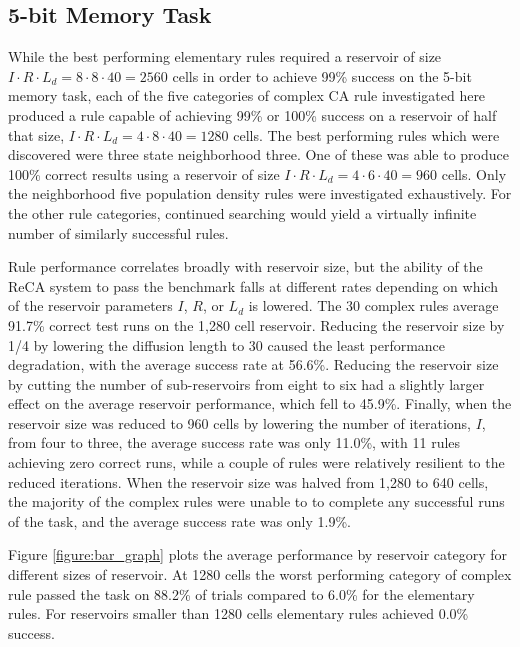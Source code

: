 \documentclass{elsarticle}
\begin{document}
\begin{multicols}{2}
	\subsection{5-bit Memory Task}
	While the best performing elementary rules required a reservoir of size $I \cdot R 
	\cdot L_{d} = 8 \cdot 8 \cdot 40 = 2560$ cells in order to achieve 99\% success on the 
	5-bit memory task, each of the five categories of complex CA rule investigated 
	here produced a rule capable of achieving 99\% or 100\% success on a reservoir 
	of half that size, $I \cdot R \cdot L_{d} = 4 \cdot 8 \cdot 40 = 1280$ cells. The best 
	performing rules which were discovered were three state neighborhood three. One of these 
	was able to produce 100\% correct results using a reservoir of size $I \cdot R \cdot 
	L_{d} = 4 \cdot 6 \cdot 40 = 960$ cells. Only the neighborhood five population density 
	rules were investigated exhaustively.  For the other rule categories, continued 
	searching would yield a virtually infinite number of similarly successful 
	rules. \par Rule performance correlates broadly with reservoir size, but the 
	ability of the ReCA system to  pass the benchmark falls at different rates 
	depending on which of the reservoir parameters $I$, $R$, or $L_{d}$ is lowered.  
	The 30 complex rules average 91.7\% correct test runs on the 1,280 cell 
	reservoir.  Reducing the reservoir size by 1/4 by lowering the diffusion length 
	to 30 caused the least performance degradation, with the average success rate 
	at 56.6\%. Reducing the reservoir size by cutting the number of sub-reservoirs 
	from eight to six had a slightly larger effect on the average reservoir 
	performance, which fell to 45.9\%.  Finally, when the reservoir size was 
	reduced to 960 cells by lowering the number of iterations, $I$, from four to 
	three, the average success rate was only 11.0\%, with 11 rules achieving zero 
	correct runs, while a  couple of rules were  relatively resilient to the 
	reduced iterations. When the reservoir size was halved from 1,280 to 640  
        cells, the majority of the complex rules were unable to to complete any 
        successful runs of the task, and the average success rate was only 
        1.9\%. \par Figure \ref{figure:bar_graph} plots the average performance 
        by reservoir category for different sizes of reservoir. At 1280 cells 
        the worst performing category of complex rule passed the task on 88.2\% 
        of trials compared to 6.0\% for the elementary rules. For reservoirs 
        smaller than 1280 cells elementary rules achieved 0.0\% success. 
	


\end{multicols}
\end{document}
